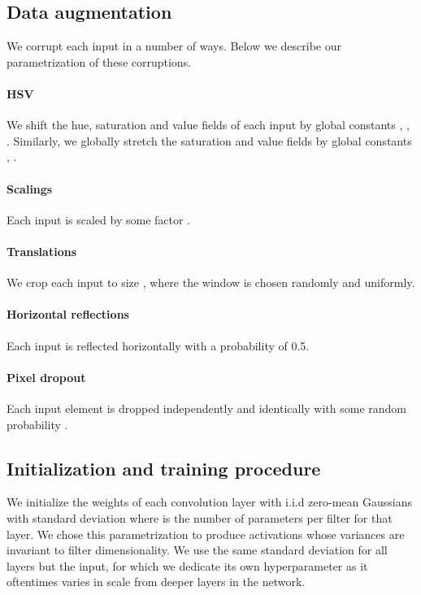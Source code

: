 \documentclass{article}
\begin{document}
\subsection{Data augmentation}
We corrupt each input in a number of ways. Below we describe our parametrization of these corruptions.

\paragraph{HSV} We shift the hue, saturation and value fields of each input by global constants , , . Similarly, we globally stretch the saturation and value fields by global constants , .

\paragraph{Scalings} Each input is scaled by some factor .

\paragraph{Translations} We crop each input to size , where the window is chosen randomly and uniformly.

\paragraph{Horizontal reflections} Each input is reflected horizontally with a probability of 0.5.

\paragraph{Pixel dropout} Each input element is dropped independently and identically with some random probability .

\subsection{Initialization and training procedure}
We initialize the weights of each convolution layer  with i.i.d zero-mean Gaussians with standard deviation  where  is the number of parameters per filter for that layer. We chose this parametrization to produce activations whose variances are invariant to filter dimensionality. We use the same standard deviation for all layers but the input, for which we dedicate its own hyperparameter  as it oftentimes varies in scale from deeper layers in the network.
\end{document}
